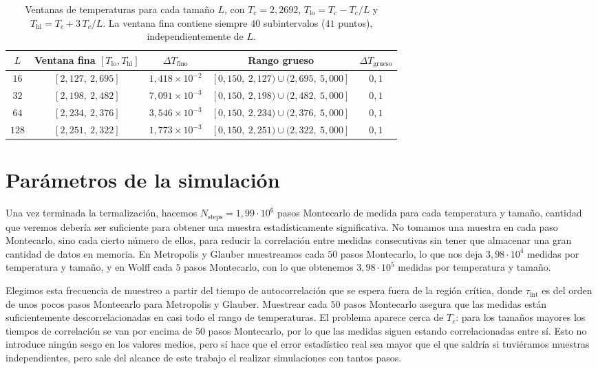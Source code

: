 \begin{table}
\centering
\begin{tabular}{ccccc}
\toprule
$L$ & Ventana fina $[T_{\text{lo}}, T_{\text{hi}}]$ & $\Delta T_{\text{fino}}$ & Rango grueso & $\Delta T_{\text{grueso}}$ \\
\midrule
$16$  & $[2{,}127,\ 2{,}695]$ & $1{,}418\times10^{-2}$ & $[0{,}150,\ 2{,}127)\cup(2{,}695,\ 5{,}000]$ & $0{,}1$ \\
$32$  & $[2{,}198,\ 2{,}482]$ & $7{,}091\times10^{-3}$ & $[0{,}150,\ 2{,}198)\cup(2{,}482,\ 5{,}000]$ & $0{,}1$ \\
$64$  & $[2{,}234,\ 2{,}376]$ & $3{,}546\times10^{-3}$ & $[0{,}150,\ 2{,}234)\cup(2{,}376,\ 5{,}000]$ & $0{,}1$ \\
$128$ & $[2{,}251,\ 2{,}322]$ & $1{,}773\times10^{-3}$ & $[0{,}150,\ 2{,}251)\cup(2{,}322,\ 5{,}000]$ & $0{,}1$ \\
\bottomrule
\end{tabular}
\caption{Ventanas de temperaturas para cada tamaño $L$, con $T_c = 2{,}2692$, $T_{\text{lo}} = T_c - T_c/L$ y $T_{\text{hi}} = T_c + 3\,T_c/L$. La ventana fina contiene siempre $40$ subintervalos ($41$ puntos), independientemente de $L$.}
\label{tab:malla_T}
\end{table}

\section{Parámetros de la simulación}

Una vez terminada la termalización, hacemos $N_{\text{steps}} = 1{,}99\cdot10^6$ pasos Montecarlo de medida para cada temperatura y tamaño, cantidad que veremos debería ser suficiente para obtener una muestra estadísticamente significativa. No tomamos una muestra en cada paso Montecarlo, sino cada cierto número de ellos, para reducir la correlación entre medidas consecutivas sin tener que almacenar una gran cantidad de datos en memoria. En Metropolis y Glauber muestreamos cada $50$ pasos Montecarlo, lo que nos deja $3,98\cdot10^4$ medidas por temperatura y tamaño, y en Wolff cada $5$ pasos Montecarlo, con lo que obtenemos $3,98\cdot10^5$ medidas por temperatura y tamaño.

Elegimos esta frecuencia de muestreo a partir del tiempo de autocorrelación que se espera fuera de la región crítica, donde $\tau_{\text{int}}$ es del orden de unos pocos pasos Montecarlo para Metropolis y Glauber. Muestrear cada $50$ pasos Montecarlo asegura que las medidas están suficientemente descorrelacionadas en casi todo el rango de temperaturas. El problema aparece cerca de $T_c$: para los tamaños mayores los tiempos de correlación se van por encima de $50$ pasos Montecarlo, por lo que las medidas siguen estando correlacionadas entre sí. Esto no introduce ningún sesgo en los valores medios, pero sí hace que el error estadístico real sea mayor que el que saldría si tuviéramos muestras independientes, pero sale del alcance de este trabajo el realizar simulaciones con tantos pasos.

